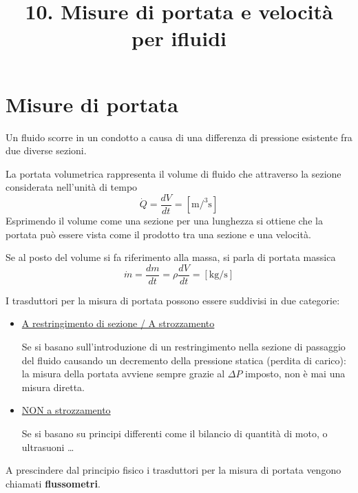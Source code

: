 \documentclass[a4paper, 15pt]{article}
\title{10. Misure di portata e velocità per ifluidi}
\date{}
\begin{document}
	\maketitle
	\setcounter{tocdepth}{5}  %
	\tableofcontents 
	\newpage
	
	
	
\section{Misure di portata}
\begin{adjustwidth}{2in}{}	
	Un fluido scorre in un condotto a causa di una differenza di pressione
	esistente fra due diverse sezioni.
	
	La portata volumetrica rappresenta il volume di fluido che
	attraverso la sezione considerata nell’unità di tempo
	\[\dot{Q} = \dfrac{dV}{dt} = [\si{\metre\cubic\per\second}]\]
	Esprimendo il volume come una sezione per una lunghezza si ottiene
	che la portata può essere vista come il prodotto tra una sezione e una
	velocità.
	
	Se al posto del volume si fa riferimento alla massa, si parla di
	portata massica
	\[\dot{m} = \dfrac{dm}{dt} = \rho\dfrac{dV}{dt} = [\si{\kilogram\per\second}]\]
	
	I trasduttori per la misura di portata possono essere suddivisi in due categorie:
	\begin{itemize}
		\item\underline{A restringimento di sezione / A strozzamento} 
		
		Se si basano sull'introduzione di un restringimento nella sezione di passaggio del fluido causando un decremento della pressione statica (perdita di carico): la misura della portata avviene sempre grazie al $\Delta P$ imposto, non è mai una misura diretta.
		
		\item \underline{NON a strozzamento}
		
		Se si basano su principi differenti come il bilancio di quantità di moto, o ultrasuoni \dots		
	\end{itemize}
	A prescindere dal principio fisico i trasduttori per la misura di portata
	vengono chiamati \textbf{flussometri}. 
\end{adjustwidth}
\end{document}
